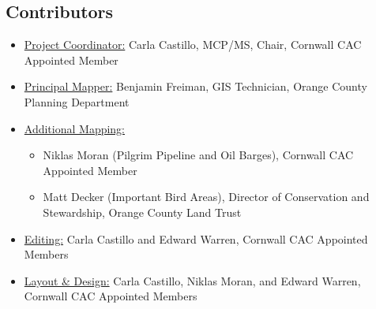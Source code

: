 \subsection*{Contributors}\label{subsec:contributors}
\begin{itemize}
    \item \underline{Project Coordinator:} Carla Castillo, MCP/MS, Chair, 
Cornwall CAC Appointed Member
    \item \underline{Principal Mapper:} Benjamin Freiman, GIS Technician, 
Orange County Planning Department
    \item \underline{Additional Mapping:}
    \begin{itemize}
        \item Niklas Moran (Pilgrim Pipeline and Oil Barges), Cornwall CAC 
Appointed Member
        \item Matt Decker (Important Bird Areas), Director of Conservation and 
Stewardship, Orange County Land Trust
    \end{itemize}
    \item \underline{Editing:} Carla Castillo and Edward Warren, Cornwall CAC 
Appointed Members
    \item \underline{Layout \& Design:} Carla Castillo, Niklas Moran, and Edward 
Warren, Cornwall CAC Appointed Members
\end{itemize}
\pagebreak

